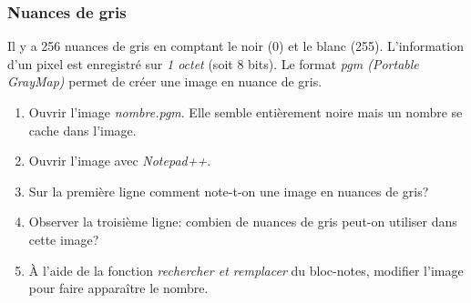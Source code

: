 \documentclass[a4paper,11pt]{article}
\begin{document}
\begin{Form}
\subsubsection{Nuances de gris}
Il y a 256 nuances de gris en comptant le noir (0) et le blanc (255). L'information d'un pixel est enregistré sur \emph{1 octet} (soit 8 bits). Le format \emph{pgm (Portable GrayMap)} permet de créer une image en nuance de gris.
\begin{activite}
\begin{enumerate}
\item Ouvrir l'image \emph{nombre.pgm}. Elle semble entièrement noire mais un nombre se cache dans l'image.
\item Ouvrir l'image avec \emph{Notepad++}.
\item Sur la première ligne comment note-t-on une image en nuances de gris?
\item Observer la troisième ligne: combien de nuances de gris peut-on utiliser dans cette image?
\item À l'aide de la fonction \emph{rechercher et remplacer} du bloc-notes, modifier l'image pour faire apparaître le nombre.
\end{enumerate}
\end{activite}

\end{Form}
\end{document}

